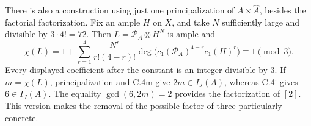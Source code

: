 There is also a construction using just one principalization of
$A\times\widehat A$, besides the factorial factorization.
Fix an ample $H$ on $X$, and take $N$ sufficiently large and divisible
by $3\cdot4!=72$. Then
$L=\mathcal P_A\otimes H^N$ is ample and
\[
 \chi(L)
 =1+\sum_{r=1}^{4}\frac{N^r}{r!(4-r)!}
             \deg\bigl(c_1(\mathcal P_A)^{4-r}c_1(H)^r\bigr)
 \equiv1\pmod3.
\]
Every displayed coefficient after the constant is an integer
divisible by $3$. If $m=\chi(L)$, principalization and C.4m give
$2m\in I_J(A)$, whereas C.4i gives $6\in I_J(A)$.
The equality $\gcd(6,2m)=2$ provides the factorization of $[2]$.
This version makes the removal of the possible factor of three
particularly concrete.
